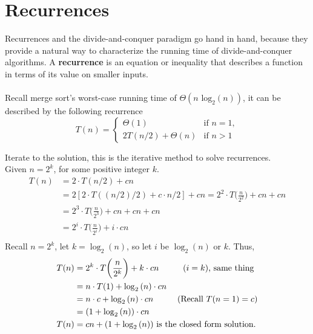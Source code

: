 \documentclass{article}
\begin{document}
\section*{Recurrences}
Recurrences and the divide-and-conquer paradigm go hand in hand, because they provide a natural way to characterize the running time of divide-and-conquer algorithms. A \textbf{recurrence} is an equation or inequality that describes a function in terms of its value on smaller inputs. 
\\ \\
Recall merge sort's worst-case running time of $\Theta{(n\text{ log}_2(n))}$, it can be described by the following recurrence\\
$$
T(n)=
\begin{cases}
\Theta(1) & \text{if } n = 1,\\
2T(n/2) + \Theta{(n)} & \text{if } n > 1
\end{cases}
$$

Iterate to the solution, this is the iterative method to solve recurrences.\\
Given $n=2^k$, for some positive integer $k$.
\begin{equation*}
\begin{split}
  T(n) & = 2 \cdot T(n/2) + cn\\
  & = 2[2 \cdot T((n/2)/2) + c \cdot n/2] + cn = 2^2 \cdot T\bigg(\frac{n}{2^2}\bigg)+cn+cn\\
  & = 2^3 \cdot T\bigg(\frac{n}{2^3}\bigg)+cn+cn+cn\\
  & = 2^i \cdot T\bigg(\frac{n}{2^i}\bigg)+i \cdot cn\\
\end{split}
\end{equation*}
Recall $n=2^k$, let $k=\log_2{(n)}$, so let $i$ be $\log_2{(n)}$ or $k$. Thus,\\
\begin{equation*}
\begin{split}
  T(n) & = 2^k \cdot T\bigg(\frac{n}{2^k}\bigg) + k \cdot cn \text{\hspace{10mm}($i=k$), same thing}\\
  & = n \cdot T(1) + \log_2{(n)} \cdot cn\\
  & = n \cdot c + \log_2{(n)} \cdot cn \text{\hspace{10mm}(Recall $T(n=1) = c$)}\\
  & = (1 + \log_2{(n)}) \cdot cn\\
  T(n) & = cn + (1 + \log_2{(n)}) \text{ is the closed form solution.}
\end{split}
\end{equation*}
\end{document}

